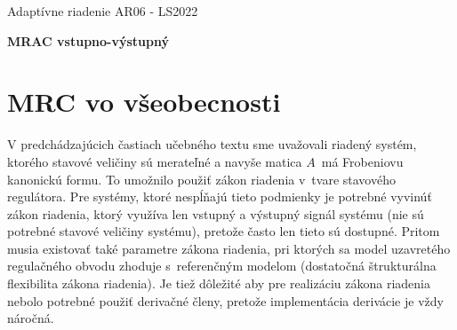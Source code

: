 \documentclass[a4paper, 10pt, ]{article}
\def\oznacenieCasti{AR06 - LS2022}
\begin{document}
\lstset{%
style=mystyle,
rangebeginprefix=\#\#\#\ cellB\ ,%
rangebeginsuffix=\ \#\#\#,%
rangeendprefix=\#\#\#\ cellE\ ,%
rangeendsuffix=\ \#\#\#,%
includerangemarker=false,
}




\fontsize{12pt}{22pt}\selectfont

\centerline{\textsf{Adaptívne riadenie} \hfill \textsf{\oznacenieCasti}}

\fontsize{18pt}{22pt}\selectfont





\begin{flushleft}
    \textbf{\textsf{MRAC vstupno-výstupný}}
\end{flushleft}





\normalsize



{\hypersetup{hidelinks}

\tableofcontents

}

\bigskip

\vspace{18pt}






















\section{MRC vo všeobecnosti}






\lettrine[lines=3, nindent=0pt]{V}{} predchádzajúcich častiach učebného textu sme uvažovali riadený systém, ktorého stavové veličiny sú merateľné a navyše matica $A$~má Frobeniovu kanonickú formu. To umožnilo použiť zákon riadenia v~tvare stavového regulátora. Pre systémy, ktoré nespĺňajú tieto podmienky je potrebné vyvinúť zákon riadenia, ktorý využíva len vstupný a výstupný signál systému (nie sú potrebné stavové veličiny systému), pretože často len tieto sú dostupné. Pritom musia existovať také parametre zákona riadenia, pri ktorých sa model uzavretého regulačného obvodu zhoduje s~referenčným modelom (dostatočná štrukturálna flexibilita zákona riadenia). Je tiež dôležité aby pre realizáciu zákona riadenia nebolo potrebné použiť derivačné členy, pretože implementácia derivácie je vždy náročná.
\end{document}
